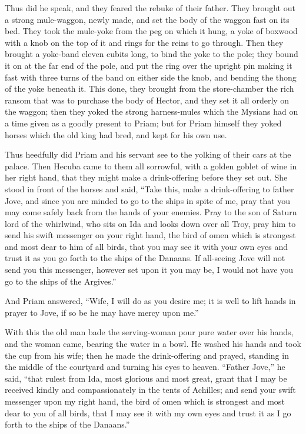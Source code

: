 Thus did he speak, and they feared the rebuke of their father. They
brought out a strong mule-waggon, newly made, and set the body of the
waggon fast on its bed. They took the mule-yoke from the peg on which it
hung, a yoke of boxwood with a knob on the top of it and rings for the
reins to go through. Then they brought a yoke-band eleven cubits long, to
bind the yoke to the pole; they bound it on at the far end of the pole,
and put the ring over the upright pin making it fast with three turns of
the band on either side the knob, and bending the thong of the yoke
beneath it. This done, they brought from the store-chamber the rich ransom
that was to purchase the body of Hector, and they set it all orderly on
the waggon; then they yoked the strong harness-mules which the Mysians had
on a time given as a goodly present to Priam; but for Priam himself they
yoked horses which the old king had bred, and kept for his own use.

Thus heedfully did Priam and his servant see to the yolking of their cars
at the palace. Then Hecuba came to them all sorrowful, with a golden
goblet of wine in her right hand, that they might make a drink-offering
before they set out. She stood in front of the horses and said, “Take
this, make a drink-offering to father Jove, and since you are minded to go
to the ships in spite of me, pray that you may come safely back from the
hands of your enemies. Pray to the son of Saturn lord of the whirlwind,
who sits on Ida and looks down over all Troy, pray him to send his swift
messenger on your right hand, the bird of omen which is strongest and most
dear to him of all birds, that you may see it with your own eyes and trust
it as you go forth to the ships of the Danaans. If all-seeing Jove will
not send you this messenger, however set upon it you may be, I would not
have you go to the ships of the Argives.”

And Priam answered, “Wife, I will do as you desire me; it is well to lift
hands in prayer to Jove, if so be he may have mercy upon me.”

With this the old man bade the serving-woman pour pure water over his
hands, and the woman came, bearing the water in a bowl. He washed his
hands and took the cup from his wife; then he made the drink-offering and
prayed, standing in the middle of the courtyard and turning his eyes to
heaven. “Father Jove,” he said, “that rulest from Ida, most glorious and
most great, grant that I may be received kindly and compassionately in the
tents of Achilles; and send your swift messenger upon my right hand, the
bird of omen which is strongest and most dear to you of all birds, that I
may see it with my own eyes and trust it as I go forth to the ships of the
Danaans.”

